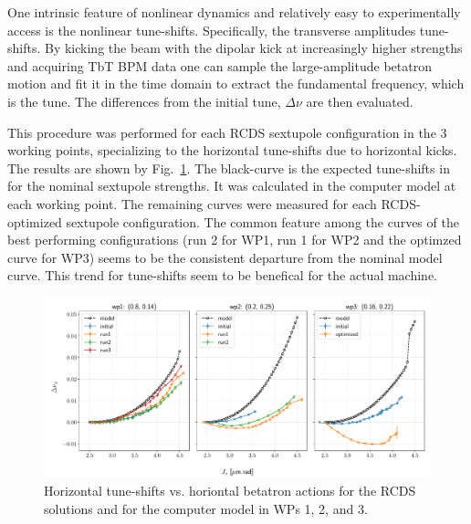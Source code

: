 One intrinsic feature of nonlinear dynamics and relatively easy to experimentally access is the nonlinear tune-shifts. Specifically, the transverse amplitudes tune-shifts. By kicking the beam with the dipolar kick at increasingly higher strengths and acquiring TbT BPM data one can sample the large-amplitude betatron motion and fit it in the time domain to extract the fundamental frequency, which is the tune. The differences from the initial tune, $\Delta\nu$ are then evaluated.

This procedure was performed for each RCDS sextupole configuration in the 3 working points, specializing to the horizontal tune-shifts due to horizontal kicks. The results are shown by Fig.~\ref{fig:adts}. The black-curve is the expected tune-shifts in for the nominal sextupole strengths. It was calculated in the computer model at each working point. The remaining curves were measured for each RCDS-optimized sextupole configuration. The common feature among the curves of the best performing configurations (run 2 for WP1, run 1 for WP2 and the optimzed curve for WP3) seems to be the consistent departure from the nominal model curve. This trend for tune-shifts seem to be benefical for the actual machine.
\begin{figure}
    \includegraphics[width=\columnwidth]{Images/opt_configs_dtunes.pdf}
    \caption[Horizontal tune-shifts vs. horiontal betatron actions for the RCDS solutions and for the computer model in WPs 1, 2, and 3.]{Horizontal tune-shifts vs. horiontal betatron actions for the RCDS solutions and for the computer model in WPs 1, 2, and 3.}
    \label{fig:adts}
\end{figure}

